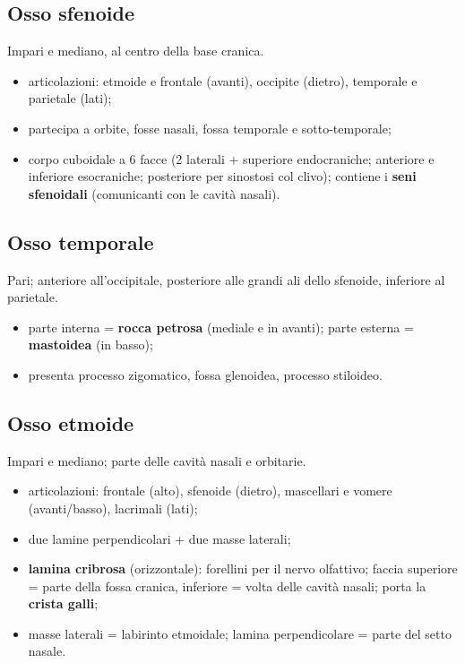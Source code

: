 \subsection{Osso sfenoide}
Impari e mediano, al centro della base cranica.
\begin{itemize}
  \item articolazioni: etmoide e frontale (avanti), occipite (dietro), temporale e parietale (lati);
  \item partecipa a orbite, fosse nasali, fossa temporale e sotto-temporale;
  \item corpo cuboidale a 6 facce (2 laterali + superiore endocraniche; anteriore e inferiore
    esocraniche; posteriore per sinostosi col clivo); contiene i \textbf{seni sfenoidali}
    (comunicanti con le cavità nasali).
\end{itemize}

\subsection{Osso temporale}
Pari; anteriore all'occipitale, posteriore alle grandi ali dello sfenoide, inferiore al parietale.
\begin{itemize}
  \item parte interna = \textbf{rocca petrosa} (mediale e in avanti); parte esterna = \textbf{mastoidea} (in basso);
  \item presenta processo zigomatico, fossa glenoidea, processo stiloideo.
\end{itemize}

\subsection{Osso etmoide}
Impari e mediano; parte delle cavità nasali e orbitarie.
\begin{itemize}
  \item articolazioni: frontale (alto), sfenoide (dietro), mascellari e vomere (avanti/basso),
    lacrimali (lati);
  \item due lamine perpendicolari + due masse laterali;
  \item \textbf{lamina cribrosa} (orizzontale): forellini per il nervo olfattivo; faccia superiore
    = parte della fossa cranica, inferiore = volta delle cavità nasali; porta la \textbf{crista
    galli};
  \item masse laterali = labirinto etmoidale; lamina perpendicolare = parte del setto nasale.
\end{itemize}

